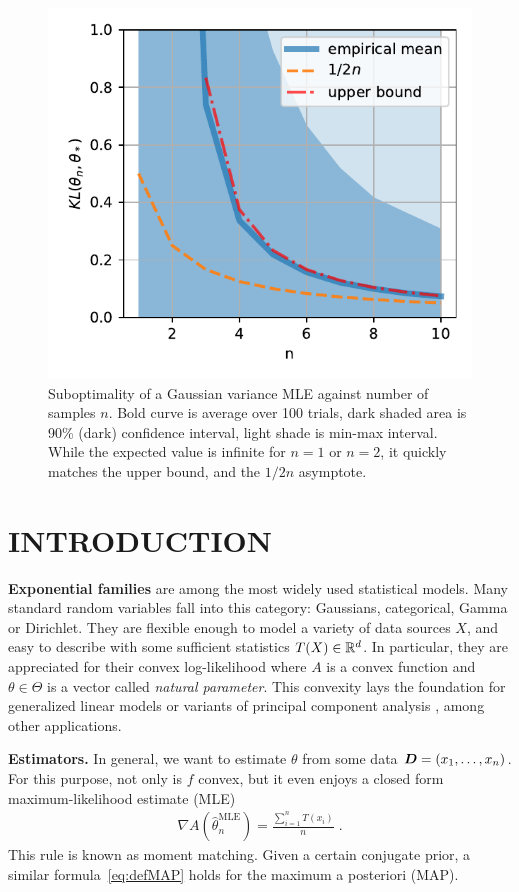 \documentclass[twoside]{article}
\let\oldsection\section
\renewcommand{\section}[1]{\oldsection{\texorpdfstring{\uppercase{#1}}{#1}}}
\newcommand{\logpart}{A}
\newcommand{\nat}{\theta}
\newcommand{\lin}[1]{\left\langle#1\right\rangle}
\begin{document}
\begin{figure}[t]
	\centering
\includegraphics[width=.4\textwidth]{fewsamples.pdf}
	\caption{Suboptimality of a Gaussian variance MLE against number of samples $n$. Bold curve is average over 100 trials,  dark shaded area is 90\% (dark) confidence interval, light shade is min-max interval.
		While the expected value is infinite for $n=1$ or $n=2$, it quickly matches the upper bound, and the $1/2n$ asymptote.
	}
	\label{fig:curves}
\end{figure}


\section{Introduction}
\label{sec:motivation}

{\bf Exponential families} are among the most widely used statistical models.
Many standard random variables fall into this category: Gaussians, categorical, Gamma or Dirichlet.
They are flexible enough to model a variety of data sources $X$, and easy to describe with some sufficient statistics $T(X) \in \mathbb{R}^d$.
In particular, they are appreciated for their convex log-likelihood
\alignn{
f(\nat) = \E[-\log p_\nat(X)] = \logpart(\nat) - \lin{\E[T(X)] , \nat},
\label{eq:defNLL}
}
where $\logpart$ is a convex function and $\nat\in\Theta$ is a vector called \textit{natural parameter}.
This convexity lays the foundation for generalized linear models \citep{mccullagh1989generalized}
or variants of principal component analysis \citep{collins2001generalization}, among other applications.

{\bf Estimators.}
In general, we want to estimate $\nat$ from some data ${\bm{D}} = (x_1, \dots, x_n)$.
For this purpose, not only is $f$ convex, but it even enjoys a closed form maximum-likelihood estimate (MLE)
\begin{align}
	\nabla \logpart(\hat \nat_n^\text{MLE}) = \frac{\sum_{i=1}^n T(x_i)}{n} \; .
	\label{eq:defMLE}
\end{align}
This rule is known as moment matching.
Given a certain conjugate prior, a similar formula~\eqref{eq:defMAP} holds for the maximum a posteriori (MAP).
\end{document}
